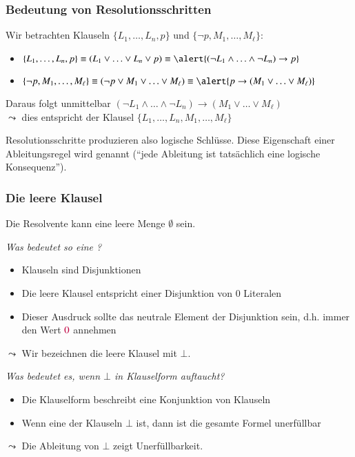 \documentclass[aspectratio=1610,onlymath]{beamer}
\begin{document}
\begin{frame}\frametitle{Bedeutung von Resolutionsschritten}

Wir betrachten Klauseln $\{L_1,\ldots,L_n,p\}$ und $\{\neg p,M_1,\ldots,M_\ell\}$:\pause
\begin{itemize}
\item $\{L_1,\ldots,L_n,p\}\equiv (L_1\vee\ldots\vee L_n\vee p) \equiv \alert{(\neg L_1\wedge\ldots\wedge\neg L_n)\to p}$\pause
\item $\{\neg p,M_1,\ldots,M_\ell\}\equiv (\neg p\vee M_1\vee\ldots\vee M_\ell)\equiv \alert{p\to (M_1\vee\ldots\vee M_\ell)}$\pause
\end{itemize}\medskip

Daraus folgt unmittelbar \alert{$(\neg L_1\wedge\ldots\wedge\neg L_n)\to (M_1\vee\ldots\vee M_\ell)$}\\
$\leadsto$ dies entspricht der Klausel $\{L_1,\ldots,L_n,M_1,\ldots,M_\ell\}$\pause
\bigskip


Resolutionsschritte produzieren also logische Schlüsse. Diese Eigenschaft einer Ableitungsregel wird  genannt ("`jede Ableitung ist tatsächlich eine logische Konsequenz"').


\end{frame}

\begin{frame}\frametitle{Die leere Klausel}

Die Resolvente kann eine leere Menge $\emptyset$ sein.\\[1ex]

\medskip

\emph{Was bedeutet so eine ?}\pause
\begin{itemize}
\item Klauseln sind Disjunktionen
\item Die leere Klausel entspricht einer Disjunktion von $0$ Literalen
\item Dieser Ausdruck sollte das neutrale Element der Disjunktion sein, d.h. immer den Wert $\textcolor{purple}{0}$ annehmen
\end{itemize}
$\leadsto$ Wir bezeichnen die leere Klausel mit $\bot$.
\bigskip\pause

\emph{Was bedeutet es, wenn $\bot$ in Klauselform auftaucht?}\pause
\begin{itemize}
\item Die Klauselform beschreibt eine Konjunktion von Klauseln
\item Wenn eine der Klauseln $\bot$ ist, dann ist die gesamte Formel unerfüllbar
\end{itemize}
$\leadsto$ Die Ableitung von $\bot$ zeigt Unerfüllbarkeit.

\end{frame}
\end{document}
